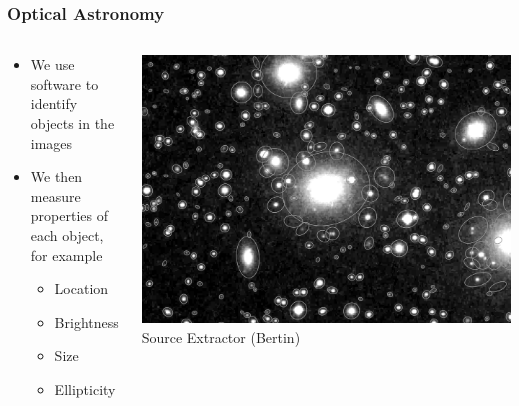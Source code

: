 \documentclass{beamer}
\begin{document}
\frame
{

    \frametitle{Optical Astronomy}


    \begin{columns}
        \begin{column}{0.4\textwidth}
            \begin{itemize}


                \item We use software to identify objects in the images

                \item We then measure properties of each object, for example

                    \begin{itemize}
                        \item Location
                        \item Brightness
                        \item Size
                        \item Ellipticity
                    \end{itemize}

            \end{itemize}
        \end{column}
        \begin{column}{0.6\textwidth}
            \begin{center}
                \includegraphics[width=\textwidth]{sun226_fig.png}
                \newline
                {\tiny Source Extractor (Bertin)}
            \end{center}

            
        \end{column}
    \end{columns}


}
\end{document}
